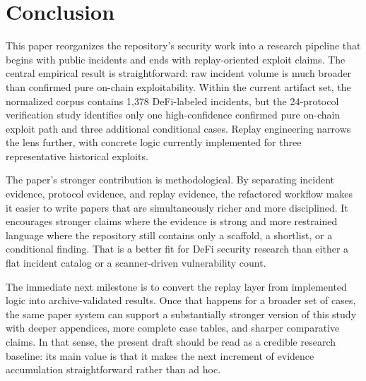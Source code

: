 \section{Conclusion}
\label{sec:conclusion}

This paper reorganizes the repository's security work into a research pipeline that begins with public incidents and ends with replay-oriented exploit claims. The central empirical result is straightforward: raw incident volume is much broader than confirmed pure on-chain exploitability. Within the current artifact set, the normalized corpus contains 1{,}378 DeFi-labeled incidents, but the 24-protocol verification study identifies only one high-confidence confirmed pure on-chain exploit path and three additional conditional cases. Replay engineering narrows the lens further, with concrete logic currently implemented for three representative historical exploits.

The paper's stronger contribution is methodological. By separating incident evidence, protocol evidence, and replay evidence, the refactored workflow makes it easier to write papers that are simultaneously richer and more disciplined. It encourages stronger claims where the evidence is strong and more restrained language where the repository still contains only a scaffold, a shortlist, or a conditional finding. That is a better fit for DeFi security research than either a flat incident catalog or a scanner-driven vulnerability count.

The immediate next milestone is to convert the replay layer from implemented logic into archive-validated results. Once that happens for a broader set of cases, the same paper system can support a substantially stronger version of this study with deeper appendices, more complete case tables, and sharper comparative claims. In that sense, the present draft should be read as a credible research baseline: its main value is that it makes the next increment of evidence accumulation straightforward rather than ad hoc.

